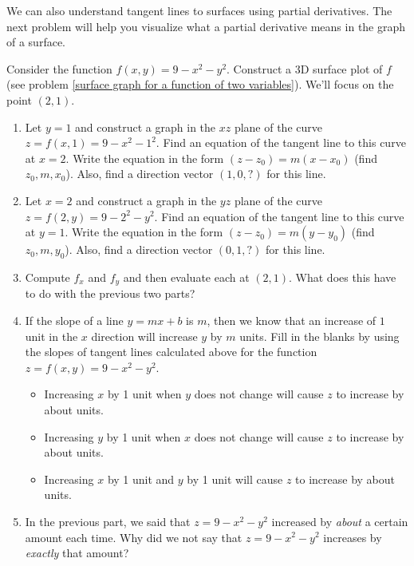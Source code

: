 We can also understand tangent lines to surfaces using partial derivatives.  The next problem will help you visualize what a partial derivative means in the graph of a surface.
\begin{problem} \label{cake introduction}%
 Consider the function $f(x,y)=9-x^2-y^2$.  Construct a 3D surface plot of $f$ (see problem \ref{surface graph for a function of two variables}). We'll focus on the point $(2,1)$.
\begin{enumerate}
 \item Let $y=1$ and construct a graph in the $xz$ plane of the curve $z=f(x,1)=9-x^2-1^2$. Find an equation of the tangent line to this curve at $x=2$. Write the equation in the form $(z-z_0)=m(x-x_0)$ (find $z_0,m,x_0$).  Also, find a direction vector $(1,0,?)$ for this line.
 \item Let $x=2$ and construct a graph in the $yz$ plane of the curve $z=f(2,y)=9-2^2-y^2$. Find an equation of the tangent line to this curve at $y=1$. Write the equation in the form $(z-z_0)=m(y-y_0)$ (find $z_0,m,y_0$).  Also, find a direction vector $(0,1,?)$ for this line.
 \item Compute $f_x$ and $f_y$ and then evaluate each at $(2,1)$.  What does this have to do with the previous two parts?
 \item If the slope of a line $y=mx+b$ is $m$, then we know that an increase of $1$ unit in the $x$ direction will increase $y$ by $m$ units. Fill in the blanks by using the slopes of tangent lines calculated above for the function $z=f(x,y)=9-x^2-y^2$.
\begin{itemize}
 \item Increasing $x$ by 1 unit when $y$ does not change will cause $z$ to increase by about \blank{1cm} units.
 \item Increasing $y$ by 1 unit when $x$ does not change will cause $z$ to increase by about \blank{1cm} units.
 \item Increasing $x$ by 1 unit and $y$ by 1 unit will cause $z$ to increase by about \blank{1cm} units.
\end{itemize}
\item In the previous part, we said that $z=9-x^2-y^2$ increased by \emph{about} a certain amount each time.  Why did we not say that $z=9-x^2-y^2$ increases by \emph{exactly} that amount?
\end{enumerate}
\end{problem}

